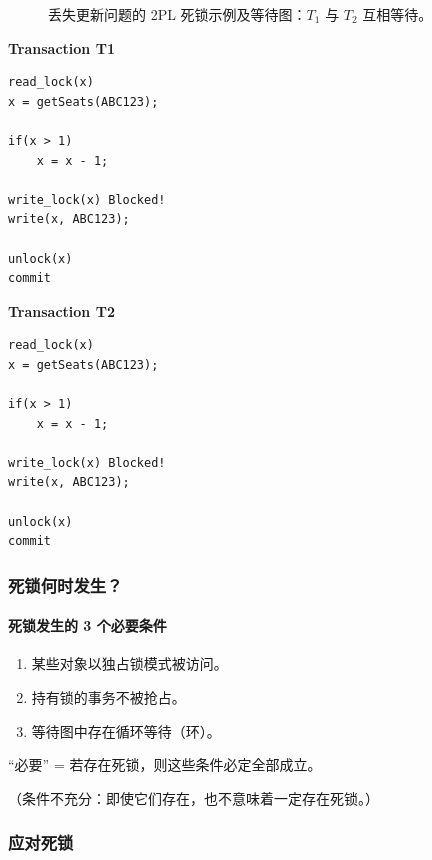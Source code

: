 \begin{figure}[H]
  \centering
  \caption{丢失更新问题的 2PL 死锁示例及等待图：$T_1$ 与 $T_2$ 互相等待。}
\end{figure}

\begin{minipage}[t]{0.47\textwidth}
\textbf{Transaction T1}
\begin{verbatim}
read_lock(x)
x = getSeats(ABC123);

if(x > 1)
    x = x - 1;

write_lock(x) Blocked!
write(x, ABC123);

unlock(x)
commit
\end{verbatim}
\end{minipage}\hfill
\begin{minipage}[t]{0.47\textwidth}
\textbf{Transaction T2}
\begin{verbatim}
read_lock(x)
x = getSeats(ABC123);

if(x > 1)
    x = x - 1;

write_lock(x) Blocked!
write(x, ABC123);

unlock(x)
commit
\end{verbatim}
\end{minipage}

\subsubsection{死锁何时发生？}

\paragraph{死锁发生的 3 个必要条件}

\begin{enumerate}
  \item 某些对象以独占锁模式被访问。
  \item 持有锁的事务不被抢占。
  \item 等待图中存在循环等待（环）。
\end{enumerate}

``必要'' = 若存在死锁，则这些条件必定全部成立。

（条件不充分：即使它们存在，也不意味着一定存在死锁。）

\subsubsection{应对死锁}


